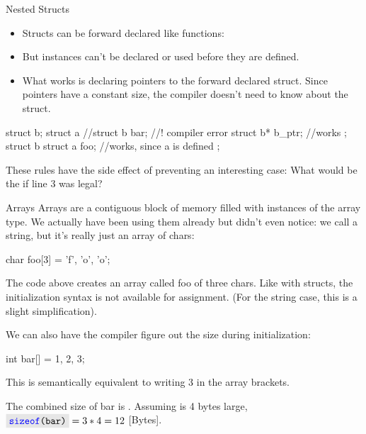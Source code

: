 \documentclass[10pt,graphics,aspectratio=169,table]{beamer}
\begin{document}
\begin{frame}[fragile]{Nested Structs}
    \begin{itemize}
        \item Structs can be forward declared like functions: 
        \item But instances can't be declared or used before they are defined.
        \item 
             What works is declaring pointers to the forward declared struct.
             Since pointers have a constant size, the compiler doesn't need to
             know about the struct.
    \end{itemize}
 
     \begin{codeblock}
 struct b;
 struct a{
     //struct b bar; //! compiler error
     struct b* b_ptr; //works
 };
 struct b{
     struct a foo; //works, since a is defined
 };
     \end{codeblock}
 
     These rules have the side effect of preventing an interesting case:
     What would be the  if line 3 was legal?
 \end{frame}

\begin{frame}[fragile]{Arrays}
    Arrays are a contiguous block of memory 
    filled with instances of the array type.
    We actually have been using them already but didn't even notice:
    we call  a string, but it's really just an array of chars:
    \begin{codeblock}
char foo[3] = {'f', 'o', 'o'}; 
    \end{codeblock} 

    The code above creates an array called foo of three chars.
    Like with structs, the initialization syntax is not available for
    assignment. (For the string case, this is a slight simplification).
    
    We can also have the compiler figure out the size during initialization:
    \begin{codeblock}
int bar[] = {1, 2, 3};
    \end{codeblock} 

    This is semantically equivalent to writing 3 in the array brackets.

    The combined size of bar is .
    Assuming  is 4 bytes large, $\code{sizeof(bar)} = 3 * 4 = 12$ [Bytes].
   
\end{frame}
\end{document}
